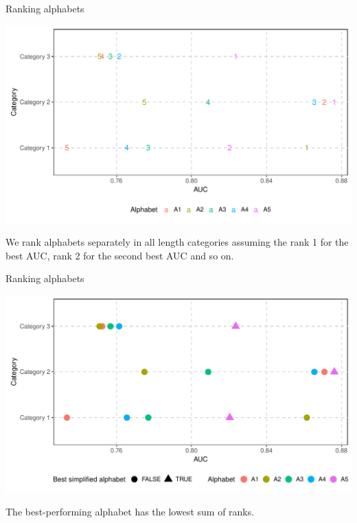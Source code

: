 \documentclass{beamer}\usepackage[]{graphicx}\usepackage[]{color}
\makeatletter
\def\maxwidth{ %
  \ifdim\Gin@nat@width>\linewidth
    \linewidth
  \else
    \Gin@nat@width
  \fi
}
\newenvironment{knitrout}{}{} %
\makeatother
\begin{document}
\begin{frame}{Ranking alphabets}
\begin{knitrout}
\color{fgcolor}

{\centering \includegraphics[width=\maxwidth]{figure/unnamed-chunk-13-1} 

}



\end{knitrout}
We rank alphabets separately in all length categories assuming the rank 1 for the best AUC, rank 2 for the second best AUC and so on.


\end{frame}

\begin{frame}{Ranking alphabets}
\begin{knitrout}
\color{fgcolor}

{\centering \includegraphics[width=\maxwidth]{figure/unnamed-chunk-14-1} 

}



\end{knitrout}
The best-performing alphabet has the lowest sum of ranks.  

\end{frame}
  
\end{document}
